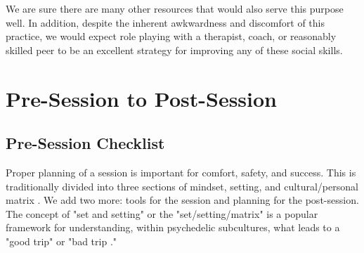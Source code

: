\documentclass[12pt,letterpaper]{book}
\begin{document}
We are sure there are many other resources that would also serve this purpose well. In addition, despite the inherent awkwardness and discomfort of this practice, we would expect role playing with a therapist, coach, or reasonably skilled peer to be an excellent strategy for improving any of these social skills.
\chapter{Pre-Session to Post-Session}
\section{Pre-Session Checklist}
\label{prep}
Proper planning of a session is important for comfort, safety, and success. This is traditionally divided into three sections of mindset, setting, and cultural/personal matrix \cite{setSettingMatrix}. We add two more: tools for the session and planning for the post-session. The concept of "set and setting" or the "set/setting/matrix" is a popular framework for understanding, within psychedelic subcultures, what leads to a "good trip" or "bad trip \cite{setSettingMatrix}."
\end{document}
